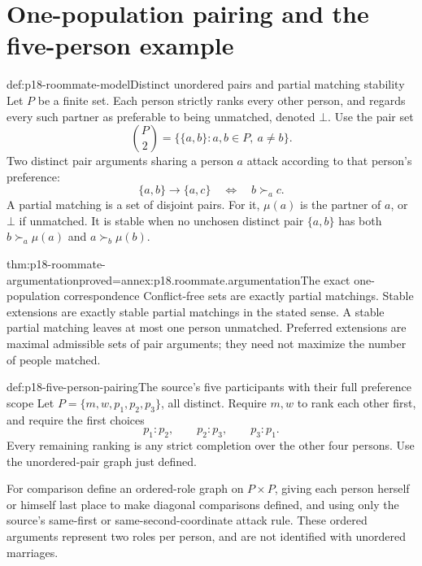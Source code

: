 \section{One-population pairing and the five-person example}

\begin{hbdefinition}{def:p18-roommate-model}{Distinct unordered pairs and partial matching stability}
Let \(P\) be a finite set. Each person
strictly ranks every other person, and
regards every such partner as preferable
to being unmatched, denoted \(\bot\).
Use the pair set
\[
                    {P\choose2}=\{\{a,b\}:a,b\in P,\ a\ne b\}.
\]
Two distinct pair arguments sharing a
person \(a\) attack according to that
person's preference:
\[
              \{a,b\}\to\{a,c\}\quad\Longleftrightarrow\quad b\succ_a c.
\]
A partial matching is a set of disjoint
pairs. For it, \(\mu(a)\) is the
partner of \(a\), or \(\bot\) if
unmatched. It is stable when no
unchosen distinct pair \(\{a,b\}\)
has both \(b\succ_a\mu(a)\) and
\(a\succ_b\mu(b)\).
\end{hbdefinition}

\begin{hbtheorem}{thm:p18-roommate-argumentation}{proved=annex:p18.roommate.argumentation}{The exact one-population correspondence}
Conflict-free sets are exactly partial
matchings. Stable extensions are exactly
stable partial matchings in the stated
sense. A stable partial matching leaves
at most one person unmatched.
Preferred extensions are maximal admissible
sets of pair arguments; they need not
maximize the number of people matched.
\end{hbtheorem}

\begin{hbdefinition}{def:p18-five-person-pairing}{The source's five participants with their full preference scope}
Let \(P=\{m,w,p_1,p_2,p_3\}\), all distinct.
Require \(m,w\) to rank each other first,
and require the first choices
\[
                     p_1:p_2,\qquad p_2:p_3,\qquad p_3:p_1.
\]
Every remaining ranking is any strict
completion over the other four persons.
Use the unordered-pair graph just defined.

For comparison define an ordered-role
graph on \(P\times P\), giving each
person herself or himself last place
to make diagonal comparisons defined,
and using only the source's same-first
or same-second-coordinate attack rule.
These ordered arguments represent two
roles per person, and are not identified
with unordered marriages.
\end{hbdefinition}


